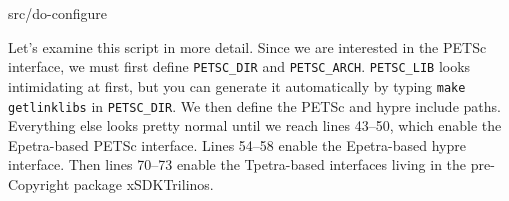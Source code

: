 \begin{lstinputlisting}[caption=do-configure,label=config-script]{src/do-configure}
\end{lstinputlisting}

Let's examine this script in more detail.  Since we are interested in the PETSc
interface, we must first define {\tt PETSC\_DIR} and {\tt PETSC\_ARCH}. 
{\tt PETSC\_LIB} looks intimidating at first, but you can generate it
automatically by typing {\tt make getlinklibs} in {\tt PETSC\_DIR}.  We then
define the PETSc and hypre include paths.  Everything else looks pretty normal
until we reach lines 43--50, which enable the Epetra-based PETSc interface. 
Lines 54--58 enable the Epetra-based hypre interface.  Then lines 70--73 enable
the Tpetra-based interfaces living in the pre-Copyright package xSDKTrilinos.